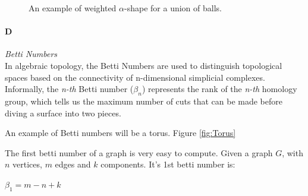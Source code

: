 \documentclass[11pt]{article}
\begin{document}
\begin{figure}
	\caption{\label{fig:Dual Shape} An example of weighted $\alpha$-shape for a union of balls. \cite{DualShape}}
\end{figure}

\paragraph{D} \emph{Betti Numbers} \hfill \\
\indent In algebraic topology, the Betti Numbers are used to distinguish topological spaces based on the connectivity of n-dimensional simplicial complexes. Informally, the \emph{n-th} Betti number ($\beta_n$) represents the rank of the \emph{n-th} homology group, which tells us the maximum number of cuts that can be made before diving a surface into two pieces. \cite{betti wiki}

\indent An example of Betti numbers will be a torus. Figure \ref{fig:Torus}

\indent The first betti number of a graph is very easy to compute. Given a graph $G$, with $n$ vertices, $m$ edges and $k$ components. It's 1st betti number is:

$\beta_1 = m - n + k$
\end{document}
